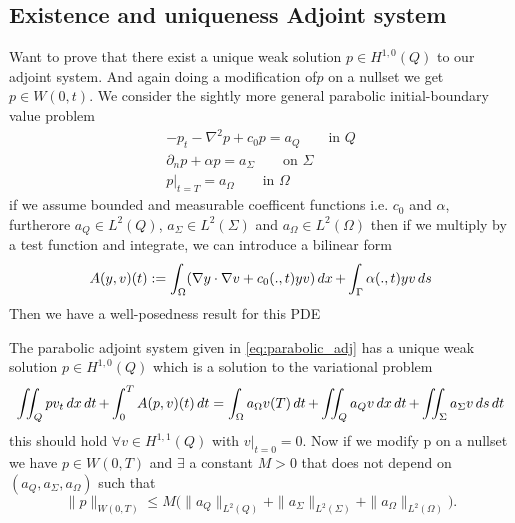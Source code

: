 \subsection{Existence and uniqueness Adjoint system}
Want to prove that there exist a unique weak solution $p \in H^{1,0}(Q)$ to our adjoint system. And again doing a modification of$p$ on a nullset we get $p\in W(0,t)$. We consider the sightly more general parabolic initial-boundary value problem 
\begin{align*}
    -p_t -\nabla^2p +c_0p = a_Q \qquad \text{in } Q \\
    \partial_np + \alpha p = a_{\Sigma} \qquad \text{on } \Sigma \\
    p|_{t=T} = a_{\Omega} \qquad \text{in } \Omega
\end{align*}
if we assume bounded and measurable coefficent functions i.e. $c_0$ and $\alpha$, furtherore $a_Q \in L^2(Q)$, $a_{\Sigma} \in L^2(\Sigma)$ and $a_{\Omega} \in L^2(\Omega)$ then if we multiply by a test function and integrate, we can introduce a bilinear form
\begin{equation}
    \label{eq:parabolic_adj}
    A(y,v)(t) := \int_{\Omega}(\nabla y \cdot \nabla v + c_0(.,t)yv) \mathop{dx} + \int_{\Gamma}\alpha(.,t)yv \mathop{ds}
\end{equation}
Then we have a well-posedness result for this PDE
\begin{lemma}
The parabolic adjoint system given in \eqref{eq:parabolic_adj} has a unique weak solution $p \in H^{1,0}(Q)$ which is a solution to the variational problem 
\begin{equation*}
    \iint_Q pv_t \mathop{dx}\mathop{dt} + \int_0^TA(p,v)(t)\mathop{dt} = \int_{\Omega}a_{\Omega}v(T) \mathop{dt} + \iint_Q a_Qv \mathop{dx}\mathop{dt} + \iint_{\Sigma}a_{\Sigma}v \mathop{ds}\mathop{dt}
\end{equation*}
this should hold $\forall v \in H^{1,1}(Q)$ with $v|_{t=0} = 0$. Now if we modify p on a nullset we have $p\in W(0,T)$ and $\exists$ a constant $M>0$ that does not depend on $(a_Q,a_{\Sigma}, a_{\Omega})$ such that 
\begin{equation*}
    \|p\|_{W(0,T)} \leq M \bigg (\|a_Q\|_{L^2(Q)} + \|a_{\Sigma}\|_{L^2(\Sigma)} + \|a_{\Omega}\|_{L^2(\Omega)} \bigg ).
\end{equation*}
\end{lemma}

